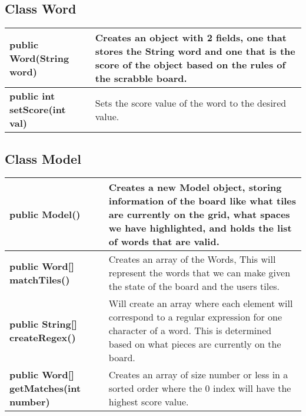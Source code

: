 \documentclass[11pt]{article}
\begin{document}
\subsection{Class Word}

\begin{tabular}{|p{}|p{}|}
\hline
\textbf{public Word(String word)} & Creates an object with 2 fields, one that stores the String word and one that is the score of the object based on the rules of the scrabble board.\\
\hline
\textbf{public int setScore(int val)} & Sets the score value of the word to the desired value. \\
\hline
\end{tabular}

\subsection{Class Model}
\begin{tabular}{|p{}|p{}|}
\hline
\textbf{public Model()} & Creates a new Model object, storing information of the board like what tiles are currently on the grid, what spaces we have highlighted, and holds the list of words that are valid.\\
\hline
\textbf{public Word[] matchTiles()} & Creates an array of the Words, This will represent the words that we can make given the state of the board and the users tiles.\\
\hline
\textbf{public String[] createRegex()} & Will create an array where each element will correspond to a regular expression for one character of a word. This is determined based on what pieces are currently on the board.\\
\hline
\textbf{public Word[] getMatches(int number)} & Creates an array of size number or less in a sorted order where the 0 index will have the highest score value.\\
\hline
\end{tabular}

\end{document}
